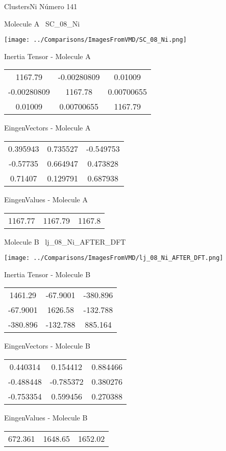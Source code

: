 \vtab[-3cm]
\begin{center}
{\large ClustersNi \tab Número 141}
\end{center}
\begin{multicols}{2}
\begin{center}

Molecule A \
SC\_08\_Ni

\texttt{[image: ../Comparisons/ImagesFromVMD/SC\_08\_Ni.png]}

Inertia Tensor - Molecule A \\
\begin{tabular}{|c c c|}
1167.79	 & 	-0.00280809	 & 	0.01009	 \\
-0.00280809	 & 	1167.78	 & 	0.00700655	 \\
0.01009	 & 	0.00700655	 & 	1167.79
\end{tabular}

\vtab
 EingenVectors - Molecule A     \\
\begin{tabular}{|c c c|}
0.395943	 & 	0.735527	 & 	-0.549753	 \\
-0.57735	 & 	0.664947	 & 	0.473828	 \\
0.71407	 & 	0.129791	 & 	0.687938
\end{tabular}

\vtab
 EingenValues - Molecule A     \\
\begin{tabular}{|c c c|}
1167.77	 & 	1167.79	 & 	1167.8	 \\
\end{tabular}
\columnbreak

Molecule B \
lj\_08\_Ni\_AFTER\_DFT

\texttt{[image: ../Comparisons/ImagesFromVMD/lj\_08\_Ni\_AFTER\_DFT.png]}

Inertia Tensor - Molecule B \\
\begin{tabular}{|c c c|}
1461.29	 & 	-67.9001	 & 	-380.896	 \\
-67.9001	 & 	1626.58	 & 	-132.788	 \\
-380.896	 & 	-132.788	 & 	885.164
\end{tabular}

\vtab
 EingenVectors - Molecule B     \\
\begin{tabular}{|c c c|}
0.440314	 & 	0.154412	 & 	0.884466	 \\
-0.488448	 & 	-0.785372	 & 	0.380276	 \\
-0.753354	 & 	0.599456	 & 	0.270388
\end{tabular}

\vtab
 EingenValues - Molecule B     \\
\begin{tabular}{|c c c|}
672.361	 & 	1648.65	 & 	1652.02	 \\
\end{tabular}

\end{center}
\end{multicols}

